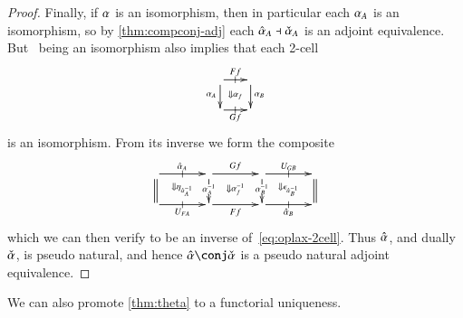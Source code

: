 \begin{proof}
  Finally, if $\alpha$ is an isomorphism, then in particular each $\alpha_A$
  is an isomorphism, so by \autoref{thm:compconj-adj} each
  $\hat{\alpha}_A\dashv \check{\alpha}_A$ is an adjoint equivalence.  But \al\ being
  an isomorphism also implies that each 2-cell
  \[\vcenter{\xymatrix@-.5pc{ \ar[r]|-@{|}^-{Ff} \ar[d]_{\al_A} \ar@{}[dr]|{\Downarrow\al_f} &  \ar[d]^{\al_B}\\
      \ar[r]|-@{|}_-{Gf} & }}\]
  is an isomorphism.  From its inverse we form the composite
  \[\vcenter{\xymatrix@R=1.5pc@C=3pc{
      \ar[r]|-@{|}^{\alhat_A}\ar@{=}[d] \ar@{}[dr]|{\Downarrow \eta_{\hat{\alpha}_A^{-1}}} &
      \ar[r]^{Gf}\ar[d]|{\al_A\inv} \ar@{}[dr]|{\Downarrow\al_f\inv} &
      \ar[r]|-@{|}^{U_{GB}}\ar[d]|{\al_B\inv} \ar@{}[dr]|{\Downarrow \epsilon_{\hat{\alpha}_B^{-1}}} &
      \ar@{=}[d]\\
      \ar[r]|-@{|}_{U_{FA}}&
      \ar[r]_{Ff} &
      \ar[r]|-@{|}_{\alhat_B} &
    }}\]
  which we can then verify to be an inverse of~\eqref{eq:oplax-2cell}.
  Thus $\hat{\alpha}$, and dually $\check{\alpha}$, is pseudo natural, and hence
  $\alhat\conj\alchk$ is a pseudo natural adjoint equivalence.
\end{proof}

We can also promote \autoref{thm:theta} to a functorial uniqueness.

